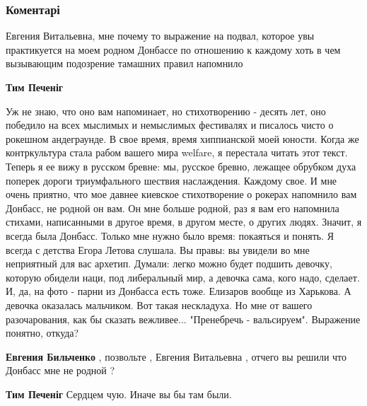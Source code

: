  
 
 
 
 
\subsubsection{Коментарі}

\begin{itemize} %

Евгения Витальевна, мне почему то выражение на подвал, которое увы практикуется
на моем родном Донбассе по отношению к каждому хоть в чем вызывающим подозрение
тамашних правил напомнило

\begin{itemize} %
\textbf{Тим Печеніг} 

Уж не знаю, что оно вам напоминает, но стихотворению - десять лет, оно победило
на всех мыслимых и немыслимых фестивалях и писалось чисто о рокешном
андеграунде. В свое время, время хиппианской моей юности. Когда же
контркультура стала рабом вашего мира welfare, я перестала читать этот текст.
Теперь я ее вижу в русском бревне: мы, русское бревно, лежащее обрубком духа
поперек дороги триумфального шествия наслаждения. Каждому свое. И мне очень
приятно, что мое давнее киевское стихотворение о рокерах напомнило вам Донбасс,
не родной он вам. Он мне больше родной, раз я вам его напомнила стихами,
написанными в другое время, в другом месте, о других людях. Значит, я всегда
была Донбасс. Только мне нужно было время: покаяться и понять. Я всегда с
детства Егора Летова слушала. Вы правы: вы увидели во мне неприятный для вас
архетип. Думали: легко можно будет подшить девочку, которую обидели наци, под
либеральный мир, а девочка сама, кого надо, сделает. И, да, на фото - парни из
Донбасса есть тоже. Елизаров вообще из Харькова. А девочка оказалась мальчиком.
Вот такая нескладуха. Но мне от вашего разочарования, как бы сказать
вежливее... "Пренебречь - вальсируем". Выражение понятно, откуда?

\textbf{Евгения Бильченко} , позвольте , Евгения Витальевна , отчего вы решили что Донбасс мне не родной ?

\textbf{Тим Печеніг} Сердцем чую. Иначе вы бы там были.


\end{itemize}
\end{itemize}
